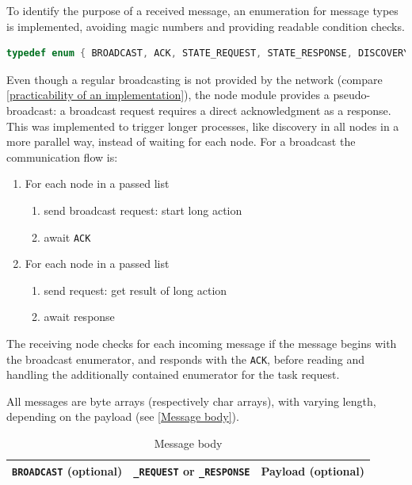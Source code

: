 To identify the purpose of a received message, an enumeration for message types is implemented, avoiding magic numbers and providing readable condition checks.

\begin{lstlisting}[language=C, caption={Message type enumeration}, label={Message type enumeration}, float, floatplacement=H]
typedef enum { BROADCAST, ACK, STATE_REQUEST, STATE_RESPONSE, DISCOVERY_START_REQUEST, ... COMPUTATION_RESULT_RESPONSE } type_message;
\end{lstlisting}

Even though a regular broadcasting is not provided by the network (compare \autoref{practicability of an implementation}), the node module provides a pseudo-broadcast: a broadcast request requires a direct acknowledgment as a response. This was implemented to trigger longer processes, like discovery in all nodes in a more parallel way, instead of waiting for each node. 
For a broadcast the communication flow is:

\begin{enumerate}
	\item For each node in a passed list
	\begin{enumerate}
		\item send broadcast request: start long action
		\item await \lstinline|ACK|
	\end{enumerate}
	\item For each node in a passed list
		\begin{enumerate}
		\item send request: get result of long action
		\item await response
	\end{enumerate}
\end{enumerate}

The receiving node checks for each incoming message if the message begins with the broadcast enumerator, and responds with the \lstinline|ACK|, before reading and handling the additionally contained enumerator for the task request.

All messages are byte arrays (respectively char arrays), with varying length, depending on the payload (see \autoref{Message body}).

\begin{table}[]
	\centering
	\caption{Message body}
	\label{Message body}
	\begin{tabular}{|l|l|l|}
		\hline
		\lstinline|BROADCAST| (optional) & \lstinline|_REQUEST| or \lstinline|_RESPONSE| & Payload (optional) \\ \hline
	\end{tabular}
\end{table}

